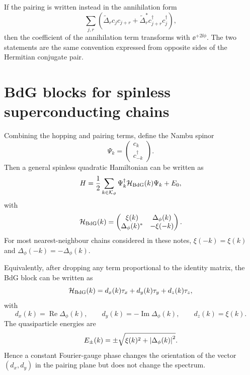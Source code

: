 If the pairing is written instead in the annihilation form
\begin{equation}
    \sum_{j,r}\left(\widetilde{\Delta}_r c_jc_{j+r}
    +\widetilde{\Delta}_r^*c_{j+r}^\dagger c_j^\dagger\right),
\end{equation}
then the coefficient of the annihilation term transforms with $\ee^{+2\ii\phi}$.
The two statements are the same convention expressed from opposite sides of the
Hermitian conjugate pair.

\section{BdG blocks for spinless superconducting chains}

Combining the hopping and pairing terms, define the Nambu spinor
\begin{equation}
\label{eq:nambu-spinor-fourier-chapter}
    \Psi_k
    =
    \begin{pmatrix}
        c_k\\
        c_{-k}^\dagger
    \end{pmatrix}.
\end{equation}
Then a general spinless quadratic Hamiltonian can be written as
\begin{equation}
\label{eq:general-bdg-momentum-form-fourier-chapter}
    H
    =
    \frac{1}{2}\sum_{k\in\mathcal{K}_\vartheta}
    \Psi_k^\dagger\mathcal{H}_{\rm BdG}(k)\Psi_k
    +E_0,
\end{equation}
with
\begin{equation}
\label{eq:bdg-block-general-fourier-chapter}
    \mathcal{H}_{\rm BdG}(k)
    =
    \begin{pmatrix}
        \xi(k) & \Delta_\phi(k)\\
        \Delta_\phi(k)^* & -\xi(-k)
    \end{pmatrix}.
\end{equation}
For most nearest-neighbour chains considered in these notes, $\xi(-k)=\xi(k)$ and
$\Delta_\phi(-k)=-\Delta_\phi(k)$.

Equivalently, after dropping any term proportional to the identity matrix, the BdG block can be
written as
\begin{equation}
\label{eq:bdg-d-vector-fourier-chapter}
    \mathcal{H}_{\rm BdG}(k)
    =
    d_x(k)\tau_x+d_y(k)\tau_y+d_z(k)\tau_z,
\end{equation}
with
\begin{equation}
    d_x(k)=\operatorname{Re}\Delta_\phi(k),
    \qquad
    d_y(k)=-\operatorname{Im}\Delta_\phi(k),
    \qquad
    d_z(k)=\xi(k).
\end{equation}
The quasiparticle energies are
\begin{equation}
\label{eq:bdg-spectrum-fourier-chapter}
    E_\pm(k)=\pm\sqrt{\xi(k)^2+\left|\Delta_\phi(k)\right|^2}.
\end{equation}
Hence a constant Fourier-gauge phase changes the orientation of the vector
$(d_x,d_y)$ in the pairing plane but does not change the spectrum.

